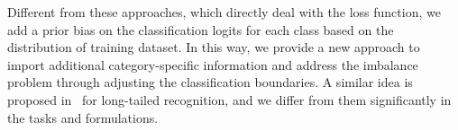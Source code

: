 Different from these approaches, which directly deal with the loss function, we add a prior bias on the classification logits for each class based on the distribution of training dataset. In this way, we provide a new approach to import additional category-specific information and address the imbalance problem through adjusting the classification boundaries.
A similar idea is proposed in~\cite{menon2020long} for long-tailed recognition, and we differ from them significantly in the tasks and formulations.

